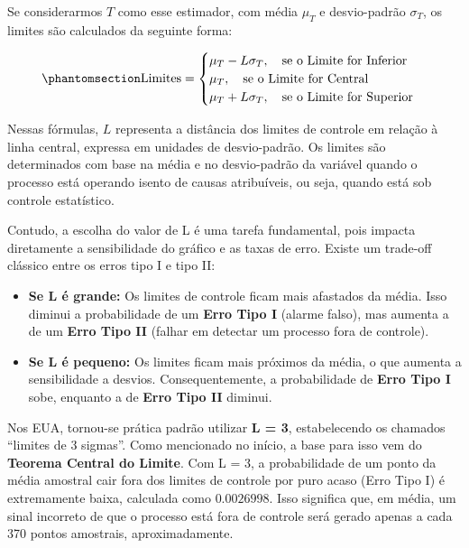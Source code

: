 \documentclass[
  portuguese,
  11pt,
  a4paper,
  DIV=11,
  numbers=noendperiod]{scrreprt}
\providecommand{\tightlist}{%
  \setlength{\itemsep}{0pt}\setlength{\parskip}{0pt}}
\begin{document}
Se considerarmos \(T\) como esse estimador, com média \(\mu_T\) e
desvio-padrão \(\sigma_T\), os limites são calculados da seguinte forma:

\begin{equation}\phantomsection\label{eq-DEF_LIMITS}{
\text{Limites} = \begin{cases} \mu_T - L\sigma_T, \quad \text{se o Limite for Inferior} \\ \mu_T, \quad \text{se o Limite for Central} \\ \mu_T + L\sigma_T, \quad \text{se o Limite for Superior} \end{cases}
}\end{equation}

Nessas fórmulas, \textbf{\(L\)} representa a distância dos limites de
controle em relação à linha central, expressa em unidades de
desvio-padrão. Os limites são determinados com base na média e no
desvio-padrão da variável quando o processo está operando isento de
causas atribuíveis, ou seja, quando está sob controle estatístico.

Contudo, a escolha do valor de L é uma tarefa fundamental, pois impacta
diretamente a sensibilidade do gráfico e as taxas de erro. Existe um
trade-off clássico entre os erros tipo I e tipo II:

\begin{itemize}
\tightlist
\item
  \textbf{Se L é grande:} Os limites de controle ficam mais afastados da
  média. Isso diminui a probabilidade de um \textbf{Erro Tipo I} (alarme
  falso), mas aumenta a de um \textbf{Erro Tipo II} (falhar em detectar
  um processo fora de controle).
\item
  \textbf{Se L é pequeno:} Os limites ficam mais próximos da média, o
  que aumenta a sensibilidade a desvios. Consequentemente, a
  probabilidade de \textbf{Erro Tipo I} sobe, enquanto a de \textbf{Erro
  Tipo II} diminui.
\end{itemize}

Nos EUA, tornou-se prática padrão utilizar \textbf{L = 3}, estabelecendo
os chamados ``limites de 3 sigmas''. Como mencionado no início, a base
para isso vem do \textbf{Teorema Central do Limite}. Com L = 3, a
probabilidade de um ponto da média amostral cair fora dos limites de
controle por puro acaso (Erro Tipo I) é extremamente baixa, calculada
como \(0.0026998\). Isso significa que, em média, um sinal incorreto de
que o processo está fora de controle será gerado apenas a cada 370
pontos amostrais, aproximadamente.
\end{document}
